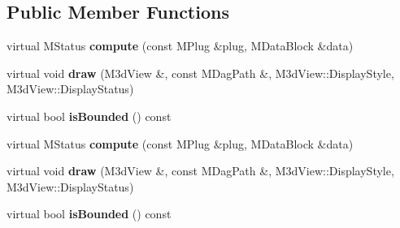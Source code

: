 \subsection*{Public Member Functions}
\begin{DoxyCompactItemize}
\item 
\hypertarget{class_m_g__pose_reader_ac5c3548456e3e65824f4fd817d7d03d6}{virtual M\-Status {\bfseries compute} (const M\-Plug \&plug, M\-Data\-Block \&data)}\label{class_m_g__pose_reader_ac5c3548456e3e65824f4fd817d7d03d6}

\item 
\hypertarget{class_m_g__pose_reader_a9e6b38a92e8fc372db1667930ca8d9ac}{virtual void {\bfseries draw} (M3d\-View \&, const M\-Dag\-Path \&, M3d\-View\-::\-Display\-Style, M3d\-View\-::\-Display\-Status)}\label{class_m_g__pose_reader_a9e6b38a92e8fc372db1667930ca8d9ac}

\item 
\hypertarget{class_m_g__pose_reader_a034a144161630705a28dfe12ddf3a54b}{virtual bool {\bfseries is\-Bounded} () const }\label{class_m_g__pose_reader_a034a144161630705a28dfe12ddf3a54b}

\item 
\hypertarget{class_m_g__pose_reader_ac5c3548456e3e65824f4fd817d7d03d6}{virtual M\-Status {\bfseries compute} (const M\-Plug \&plug, M\-Data\-Block \&data)}\label{class_m_g__pose_reader_ac5c3548456e3e65824f4fd817d7d03d6}

\item 
\hypertarget{class_m_g__pose_reader_a9e6b38a92e8fc372db1667930ca8d9ac}{virtual void {\bfseries draw} (M3d\-View \&, const M\-Dag\-Path \&, M3d\-View\-::\-Display\-Style, M3d\-View\-::\-Display\-Status)}\label{class_m_g__pose_reader_a9e6b38a92e8fc372db1667930ca8d9ac}

\item 
\hypertarget{class_m_g__pose_reader_a034a144161630705a28dfe12ddf3a54b}{virtual bool {\bfseries is\-Bounded} () const }\label{class_m_g__pose_reader_a034a144161630705a28dfe12ddf3a54b}

\end{DoxyCompactItemize}
